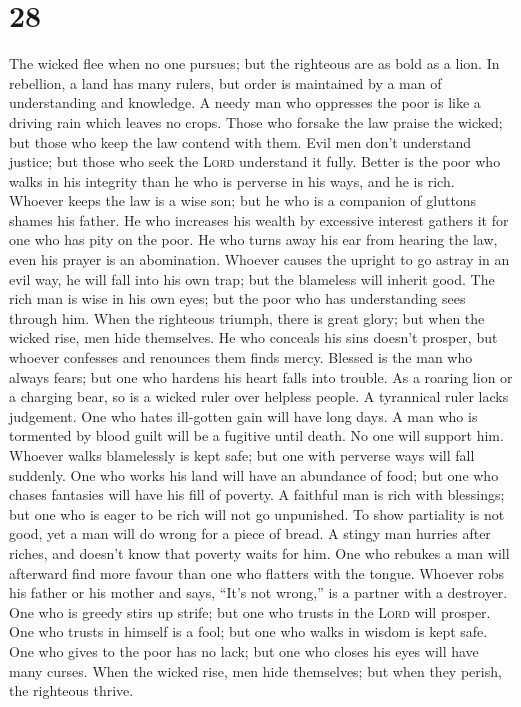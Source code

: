 \hypertarget{section-27}{%
\section{28}\label{section-27}}

 The wicked flee when no one pursues; but the righteous
are as bold as a lion.  In rebellion, a land has many
rulers, but order is maintained by a man of understanding and knowledge.
 A needy man who oppresses the poor is like a driving rain
which leaves no crops.  Those who forsake the law praise
the wicked; but those who keep the law contend with them. 
Evil men don't understand justice; but those who seek the \textsc{Lord}
understand it fully.  Better is the poor who walks in his
integrity than he who is perverse in his ways, and he is rich.
 Whoever keeps the law is a wise son; but he who is a
companion of gluttons shames his father.  He who increases
his wealth by excessive interest gathers it for one who has pity on the
poor.  He who turns away his ear from hearing the law,
even his prayer is an abomination.  Whoever causes the
upright to go astray in an evil way, he will fall into his own trap; but
the blameless will inherit good.  The rich man is wise in
his own eyes; but the poor who has understanding sees through him.
 When the righteous triumph, there is great glory; but
when the wicked rise, men hide themselves.  He who
conceals his sins doesn't prosper, but whoever confesses and renounces
them finds mercy.  Blessed is the man who always fears;
but one who hardens his heart falls into trouble.  As a
roaring lion or a charging bear, so is a wicked ruler over helpless
people.  A tyrannical ruler lacks judgement. One who
hates ill-gotten gain will have long days.  A man who is
tormented by blood guilt will be a fugitive until death. No one will
support him.  Whoever walks blamelessly is kept safe; but
one with perverse ways will fall suddenly.  One who works
his land will have an abundance of food; but one who chases fantasies
will have his fill of poverty.  A faithful man is rich
with blessings; but one who is eager to be rich will not go unpunished.
 To show partiality is not good, yet a man will do wrong
for a piece of bread.  A stingy man hurries after riches,
and doesn't know that poverty waits for him.  One who
rebukes a man will afterward find more favour than one who flatters with
the tongue.  Whoever robs his father or his mother and
says, ``It's not wrong,'' is a partner with a destroyer. 
One who is greedy stirs up strife; but one who trusts in the
\textsc{Lord} will prosper.  One who trusts in himself is
a fool; but one who walks in wisdom is kept safe.  One
who gives to the poor has no lack; but one who closes his eyes will have
many curses.  When the wicked rise, men hide themselves;
but when they perish, the righteous thrive.

